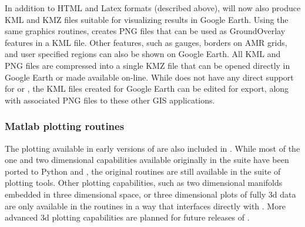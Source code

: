 In addition to HTML and Latex formats (described above), \vclaw will now also
produce KML and KMZ files suitable for visualizing results in Google Earth.
Using the same \mplotlib graphics routines, \vclaw creates PNG files
that can be used as GroundOverlay features in a KML file.  Other features, such
as gauges, borders on AMR grids, and user specified regions can also be
shown on Google Earth.  All KML and PNG files are compressed into a single
KMZ file  that can be opened directly in Google Earth or made available on-line.
While \vclaw does not have any direct support for \agis or \qgis,
the  KML files created for Google Earth can be edited for
export, along with associated PNG files to these other GIS applications.

\subsubsection{Matlab plotting routines}
The \mlab plotting available in early versions of \cpack are also included in
\vclaw.  While most of the one and two dimensional capabilities
available originally in the \mlab suite have been ported to Python and
\mplotlib, the original \mlab routines are still available in the \mlab suite of
plotting tools.  Other plotting capabilities, such as two dimensional
manifolds embedded in three dimensional space, or three dimensional
plots of fully 3d data are only available in the \mlab routines in a way that
interfaces directly with \clawpack. 
More advanced 3d plotting capabilities are planned for future releases of \vclaw.
